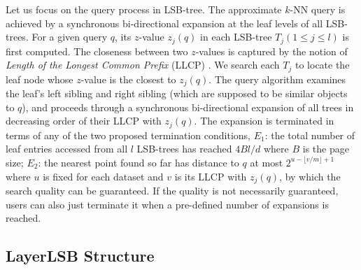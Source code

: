 Let us focus on the query process in LSB-tree. The approximate $k$-NN query is achieved by a synchronous bi-directional expansion at the leaf levels of all LSB-trees. For a given query $q$, its $z$-value $z_j(q)$ in each LSB-tree $T_j(1\leq j\leq l)$ is first computed. The closeness between two $z$-values is captured by the notion of \emph{Length of the Longest Common Prefix} (LLCP) \cite{lsb}. We search each $T_j$ to locate the leaf node whose $z$-value is the closest to $z_j(q)$. The query algorithm examines the leaf's left sibling and right sibling (which are supposed to be similar objects to $q$), and proceeds through a synchronous bi-directional expansion of all trees in decreasing order of their LLCP with $z_j(q)$. The expansion is terminated in terms of any of the two proposed termination conditions, $E_1$: the total number of leaf entries accessed from all $l$ LSB-trees has reached $4Bl/d$ where $B$ is the page size; $E_2$: the nearest point found so far has distance to $q$ at most $2^{u-\lfloor v/m\rfloor+1}$ where $u$ is fixed for each dataset and $v$ is its LLCP with $z_j(q)$, by which the search quality can be guaranteed. If the quality is not necessarily guaranteed, users can also just terminate it when a pre-defined number of expansions is reached.



\subsection{LayerLSB Structure}

